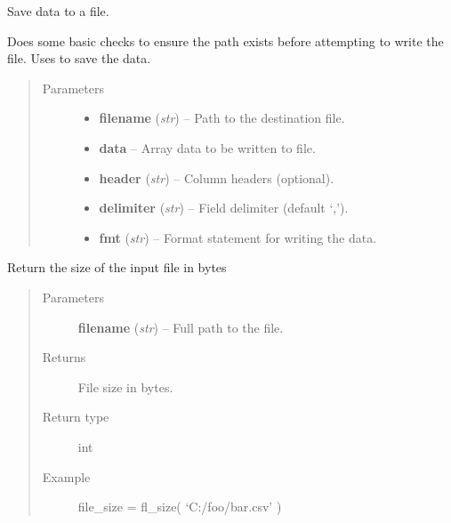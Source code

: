 \documentclass[letterpaper,10pt,english]{sphinxmanual}
\begin{document}

\begin{fulllineitems}
\label{docs/utilities:utilities.files.fl_save_file}
Save data to a file.

Does some basic checks to ensure the path exists before attempting
to write the file. Uses  to save the data.
\begin{quote}\begin{description}
\item[{Parameters}] \leavevmode\begin{itemize}
\item {} 
\textbf{filename} (\emph{str}) -- Path to the destination file.

\item {} 
\textbf{data} -- Array data to be written to file.

\item {} 
\textbf{header} (\emph{str}) -- Column headers (optional).

\item {} 
\textbf{delimiter} (\emph{str}) -- Field delimiter (default `,').

\item {} 
\textbf{fmt} (\emph{str}) -- Format statement for writing the data.

\end{itemize}

\end{description}\end{quote}

\end{fulllineitems}



\begin{fulllineitems}
\label{docs/utilities:utilities.files.fl_size}
Return the size of the input file in bytes
\begin{quote}\begin{description}
\item[{Parameters}] \leavevmode
\textbf{filename} (\emph{str}) -- Full path to the file.

\item[{Returns}] \leavevmode
File size in bytes.

\item[{Return type}] \leavevmode
int

\item[{Example }] \leavevmode
file\_size = fl\_size( `C:/foo/bar.csv' )

\end{description}\end{quote}

\end{fulllineitems}
\end{document}

